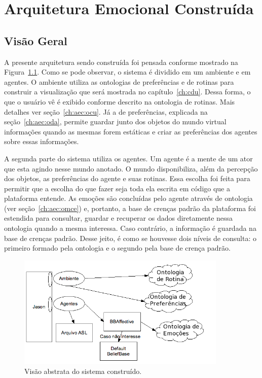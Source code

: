 \chapter{Arquitetura Emocional Constru\'ida} \label{ch:aec}

\section{Visão Geral}

A presente arquitetura sendo construída foi pensada conforme mostrado na
Figura~\ref{fig:vasc}. Como se pode observar, o sistema é dividido em um
ambiente e em agentes. O ambiente utiliza as ontologias de preferências e de
rotinas para construir a visualização que será mostrada no
capítulo~\ref{ch:cdu}. Dessa forma, o que o usuário vê é exibido conforme
descrito na ontologia de rotinas. Mais detalhes ver seção~\ref{ch:aec:ocu}. Já
a de preferências, explicada na seção~\ref{ch:aec:oda}, permite guardar junto
dos objetos do mundo virtual informações quando as mesmas forem estáticas e
criar as preferências dos agentes sobre essas informações.\dev{}

A segunda parte do sistema utiliza os agentes. Um agente é a mente de um ator
que esta agindo nesse mundo anotado. O mundo disponibiliza, além da percepção
dos objetos, as preferências do agente e suas rotinas\dev{}. Essa escolha foi
feita para permitir que a escolha do que fazer seja toda ela escrita em
código\dev{} que a plataforma \jason entende. As emoções são concluídas pelo
agente através de ontologia (ver seção~\ref{ch:aec:omce}) e, portanto, a base
de crenças padrão da plataforma foi estendida para consultar, guardar e
recuperar os dados diretamente nessa ontologia quando a mesma interessa. Caso
contrário, a informação é guardada na base de crenças padrão. Desse jeito, é
como se houvesse dois níveis de consulta: o primeiro formado pela ontologia e
o segundo pela base de crença padrão.

\begin{figure}
  \centering
  \includegraphics[width=10cm]{figuras/visao-geral.png}
  \caption{Visão abstrata do sistema construído.}
  \label{fig:vasc}
\end{figure}

